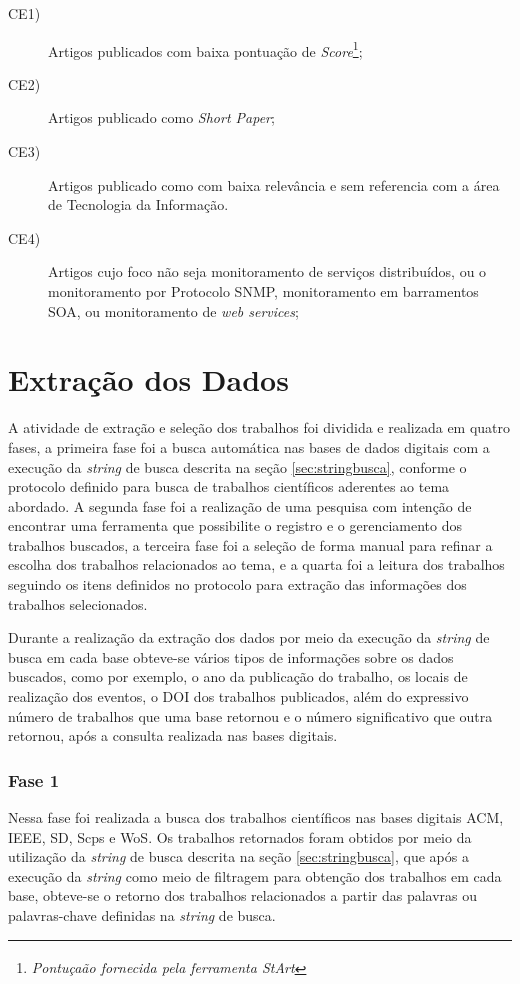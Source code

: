 \begin{description}
\item[CE1)] Artigos publicados com baixa pontuação de \textit{Score}\footnote{\textit{Pontuçaão fornecida pela ferramenta \acrshort{StArt}\textsuperscript{\textregistered}}};
\item[CE2)] Artigos publicado como \textit{Short Paper};
\item[CE3)] Artigos publicado como com baixa relevância e sem referencia com a área de Tecnologia da Informação.
\item[CE4)]Artigos cujo foco não seja monitoramento de serviços distribuídos, ou o monitoramento por Protocolo \acrshort{SNMP}, monitoramento em barramentos \acrshort{SOA}, ou monitoramento de \textit{web services};
\end{description}



\section{Extração dos Dados}
A atividade de extração e seleção dos trabalhos foi dividida e realizada em quatro fases, a primeira fase foi a busca automática nas bases de dados digitais com a execução da \textit{string} de busca descrita na seção \ref{sec:stringbusca}, conforme o protocolo definido para busca de trabalhos científicos aderentes ao tema abordado. A segunda fase foi a realização de uma pesquisa com intenção de encontrar uma ferramenta que possibilite o registro e o gerenciamento dos trabalhos buscados, a terceira fase foi a seleção de forma manual para refinar a escolha dos trabalhos relacionados ao tema, e a quarta foi a leitura dos trabalhos seguindo os itens definidos no protocolo para extração das informações dos trabalhos selecionados. 

Durante a realização da extração dos dados por meio da execução da \textit{string} de busca em cada base obteve-se vários tipos de informações sobre os dados buscados, como por exemplo, o ano da publicação do trabalho, os locais de realização dos eventos, o \acrshort{DOI} dos trabalhos publicados, além do  expressivo número de trabalhos que uma base retornou e o número significativo que outra retornou, após a consulta realizada nas bases digitais.

\subsubsection{Fase 1}
Nessa fase foi realizada a busca dos trabalhos científicos nas bases digitais \acrlong{ACM}, \acrlong{IEEE}, \acrlong{SD}, \acrlong{Scps} e \acrlong{WoS}. Os trabalhos retornados foram obtidos por meio da utilização da \textit{string} de busca descrita na seção \ref{sec:stringbusca}, que após a execução da \textit{string} como meio de filtragem para obtenção dos trabalhos em cada base, obteve-se o retorno dos trabalhos relacionados a partir das palavras ou palavras-chave definidas na \textit{string} de busca. 

